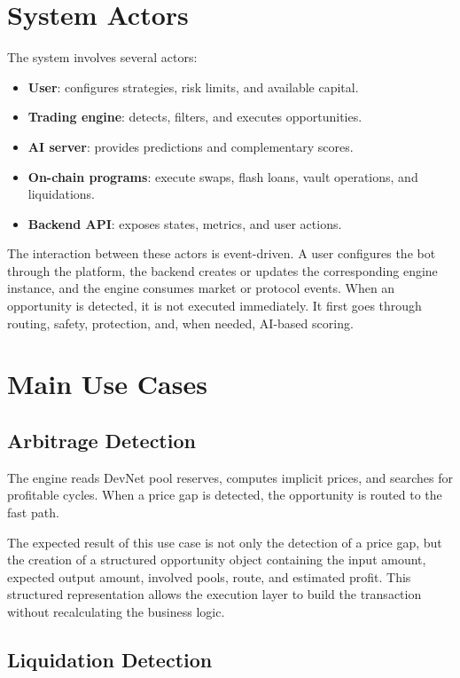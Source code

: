 \documentclass[12pt,a4paper]{report}
\begin{document}
\section{System Actors}

The system involves several actors:
\begin{itemize}
    \item \textbf{User}: configures strategies, risk limits, and available capital.
    \item \textbf{Trading engine}: detects, filters, and executes opportunities.
    \item \textbf{AI server}: provides predictions and complementary scores.
    \item \textbf{On-chain programs}: execute swaps, flash loans, vault operations, and liquidations.
    \item \textbf{Backend API}: exposes states, metrics, and user actions.
\end{itemize}

The interaction between these actors is event-driven. A user configures the bot through the platform, the backend creates or updates the corresponding engine instance, and the engine consumes market or protocol events. When an opportunity is detected, it is not executed immediately. It first goes through routing, safety, protection, and, when needed, AI-based scoring.

\section{Main Use Cases}

\subsection{Arbitrage Detection}

The engine reads DevNet pool reserves, computes implicit prices, and searches for profitable cycles. When a price gap is detected, the opportunity is routed to the fast path.

The expected result of this use case is not only the detection of a price gap, but the creation of a structured opportunity object containing the input amount, expected output amount, involved pools, route, and estimated profit. This structured representation allows the execution layer to build the transaction without recalculating the business logic.

\subsection{Liquidation Detection}
\end{document}
